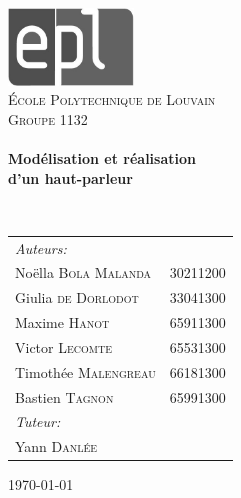 \begin{titlepage}
\begin{center}

\includegraphics[width=0.25\textwidth]{img/epl-logo-bw}~\\[1cm]

\textsc{\LARGE École Polytechnique de Louvain}\\[1cm]

\textsc{\Large Groupe 1132}\\[0.5cm]

\HRule \\[0.3cm]
{ \huge \bfseries Modélisation et réalisation \\ d’un haut-parleur \\[0.3cm] }

\HRule \\[0.8cm]

{\large
\begin{tabu} to 0.67\linewidth {Xl}
\emph{Auteurs:} &\\
    \quad Noëlla \textsc{Bola Malanda} & 30211200\\
    \quad Giulia \textsc{de Dorlodot} & 33041300\\
    \quad Maxime \textsc{Hanot} & 65911300\\
    \quad Victor \textsc{Lecomte} & 65531300\\
    \quad Timothée \textsc{Malengreau} & 66181300\\
    \quad Bastien \textsc{Tagnon} & 65991300\\
\emph{Tuteur:} &\\
    \quad Yann \textsc{Danlée}&\\
\end{tabu}
}

\vfill

{\large \today}

\end{center}
\end{titlepage}

